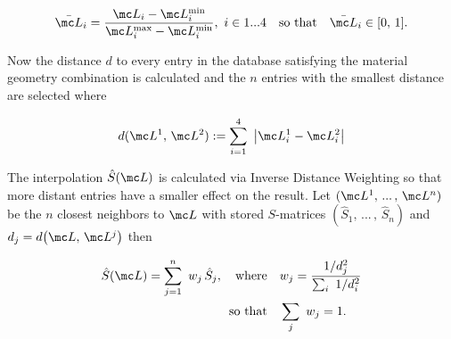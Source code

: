 \begin{equation}
    \bar{\mc L}_i = \frac{\mc L_i - \mc L_i^\s{min}}{\mc L_i^\s{max} - \mc L_i^\s{min}}
    , \  i \in 1 ... 4
    \qq{so that} \bar{\mc L}_i \in [0, \, 1].
\end{equation}

\noindent
Now the distance $d$ to every entry in the database satisfying the material geometry combination is calculated and the $n$ entries with the smallest distance are selected where

\begin{equation}
    d(\mc L^1, \, \mc L^2) := \sum_{i=1}^4 \ \qty|\mc L^1_i - \mc L^2_i|
\end{equation}

\noindent
The interpolation $\hat{S}(\mc L)$ is calculated via Inverse Distance Weighting \cite{Shepard1968} so that more distant entries have a smaller effect on the result. Let
$(\mc L^1, \, ... \, , \, \mc L^n)$ be the $n$ closest neighbors to $\mc L$ with stored $S$-matrices
$(\hat{S}_1, \, ... \, , \, \hat{S}_n)$
and
$d_j = d\qty(\mc L ,\, \mc L^j)$
then

\begin{equation}
\begin{aligned}
    \hat{S}(\mc L) = \sum_{j=1}^n \ w_j \, \hat{S}_j,
    \qq{where}&
    w_j = \frac{1 / d_j^2}{\sum_i \ 1 / d^2_i} \\
    \qq*{so that} 
    &\sum_j \ w_j = 1.
\end{aligned}
\end{equation}